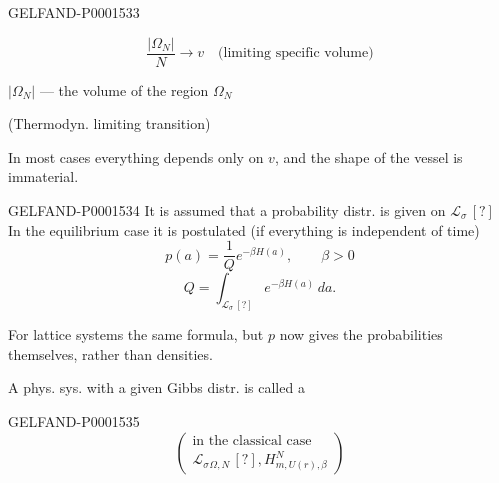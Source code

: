 \begin{GelfandAdjacentEvidence}{GELFAND-P000153}{3}
\end{GelfandAdjacentEvidence}

\begin{equation*}
\frac{|\Omega_N|}{N}\longrightarrow v\quad\text{(limiting specific volume)}
\end{equation*}
\begin{flushright}
$|\Omega_N|$ — the volume of the region $\Omega_N$
\end{flushright}
(Thermodyn. limiting transition)

In most cases everything depends only on $v$,
and the shape of the vessel is immaterial.


\par\noindent\begin{minipage}[t]{\linewidth}

\begin{GelfandAdjacentEvidence}{GELFAND-P000153}{4}
It is assumed that a probability distr. is given on $\mathcal L_\sigma\, [?]$
In the equilibrium case it is postulated
(if everything is independent of time)
\begin{equation*}
p (a)=\frac1Qe^{-\beta H (a)},\qquad\beta>0
\end{equation*}
\begin{equation*}
Q=\int_{\mathcal L_\sigma\, [?]}e^{-\beta H (a)}\, da.
\end{equation*}
\end{GelfandAdjacentEvidence}
\end{minipage}\par



For lattice systems the same formula, but $p$ now gives
the probabilities themselves, rather than densities.

A phys. sys. with a given Gibbs distr. is called
a 

\begin{GelfandAdjacentEvidence}{GELFAND-P000153}{5}
\begin{equation*}
\left (\begin{gathered}\text{in the classical case}\\
\mathcal L_\sigma{}_{\Omega, N}\, [?], H^N_{m, U (r),\beta}\end{gathered}\right)
\end{equation*}
\end{GelfandAdjacentEvidence}


